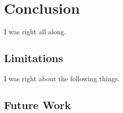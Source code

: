 \chapter{Conclusion}
\label{chap:conc}

I was right all along.

\section{Limitations}

I was right about the following things.

\section{Future Work}
